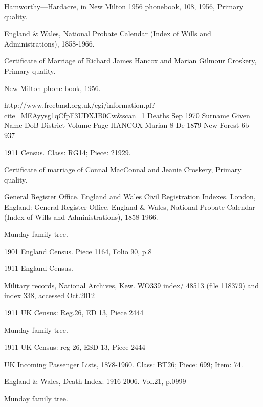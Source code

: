 \begin{thebibliography}{99}
{
	Hamworthy—Hardacre, in New Milton 1956 phonebook, 108, 1956, Primary quality.
	
	England & Wales, National Probate Calendar (Index of Wills and Administrations), 1858-1966.
	 
	Certificate of Marriage of Richard James Hancox and Marian Gilmour Croskery, Primary quality.
	
	New Milton phone book, 1956. 
	
	http://www.freebmd.org.uk/cgi/information.pl?cite=MEAyysg1qCfpF3UDXJB0Cw&scan=1
	Deaths Sep 1970
	Surname     Given Name      DoB         District    Volume      Page    
	HANCOX      Marian          8 De 1879   New Forest  6b          937
	
	1911 Census. Class: RG14; Piece: 21929.
	
	Certificate of marriage of Connal MacConnal and Jeanie Croskery, Primary quality.
	
	General Register Office. England and Wales Civil Registration Indexes. London, England: General Register Office.
	England & Wales, National Probate Calendar (Index of Wills and Administrations), 1858-1966. 
	
	Munday family tree. 
	
	 1901 England Census. Piece 1164, Folio 90, p.8

	1911 England Census.
	
	Military records, National Archives, Kew.
	WO339 index/ 48513 (file 118379) and index 338, accessed Oct.2012
	
	1911 UK Census: Reg.26, ED 13, Piece 2444 
	
	Munday family tree. 
	
	1911 UK Census: reg 26, ESD 13, Piece 2444 
	
	 UK Incoming Passenger Lists, 1878-1960. Class: BT26; Piece: 699; Item: 74.
	 
	England & Wales, Death Index: 1916-2006. Vol.21, p.0999
	
	Munday family tree. 

}
\end{thebibliography}
